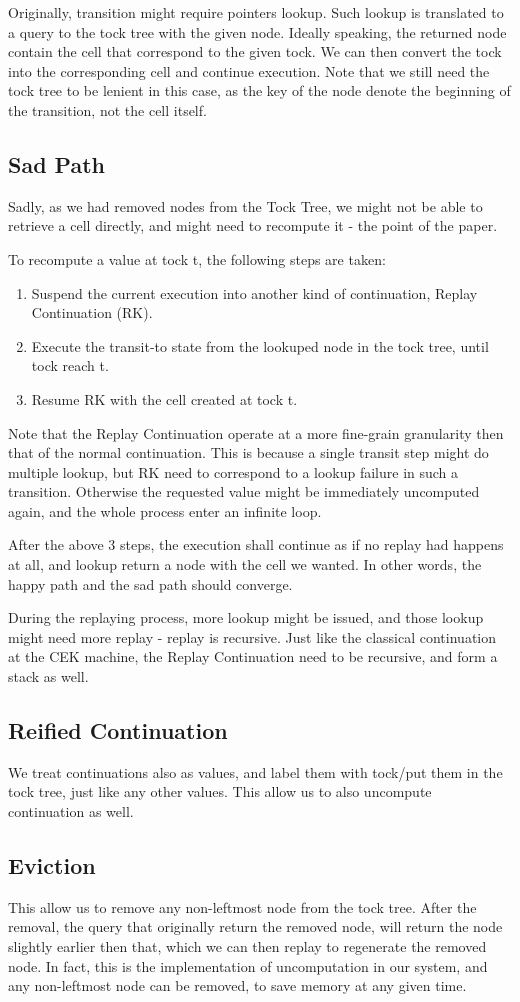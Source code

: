 Originally, transition might require pointers lookup. Such lookup is translated to a query to the tock tree with the given node. Ideally speaking, the returned node contain the cell that correspond to the given tock. We can then convert the tock into the corresponding cell and continue execution. Note that we still need the tock tree to be lenient in this case, as the key of the node denote the beginning of the transition, not the cell itself.
\subsection{Sad Path}
Sadly, as we had removed nodes from the Tock Tree, we might not be able to retrieve a cell directly, and might need to recompute it - the point of the paper.

To recompute a value at tock t, the following steps are taken:
\begin{enumerate}
	\item Suspend the current execution into another kind of continuation, Replay Continuation (RK).
	\item Execute the transit-to state from the lookuped node in the tock tree, until tock reach t.
	\item Resume RK with the cell created at tock t.
\end{enumerate}
Note that the Replay Continuation operate at a more fine-grain granularity then that of the normal continuation. This is because a single transit step might do multiple lookup, but RK need to correspond to a lookup failure in such a transition. Otherwise the requested value might be immediately uncomputed again, and the whole process enter an infinite loop.

After the above 3 steps, the execution shall continue as if no replay had happens at all, and lookup return a node with the cell we wanted. In other words, the happy path and the sad path should converge.

During the replaying process, more lookup might be issued, and those lookup might need more replay - replay is recursive. Just like the classical continuation at the CEK machine, the Replay Continuation need to be recursive, and form a stack as well.

\subsection{Reified Continuation}
We treat continuations also as values, and label them with tock/put them in the tock tree, just like any other values. This allow us to also uncompute continuation as well.

\subsection{Eviction}
This allow us to remove any non-leftmost node from the tock tree. After the removal, the query that originally return the removed node, will return the node slightly earlier then that, which we can then replay to regenerate the removed node. In fact, this is the implementation of uncomputation in our system, and any non-leftmost node can be removed, to save memory at any given time.